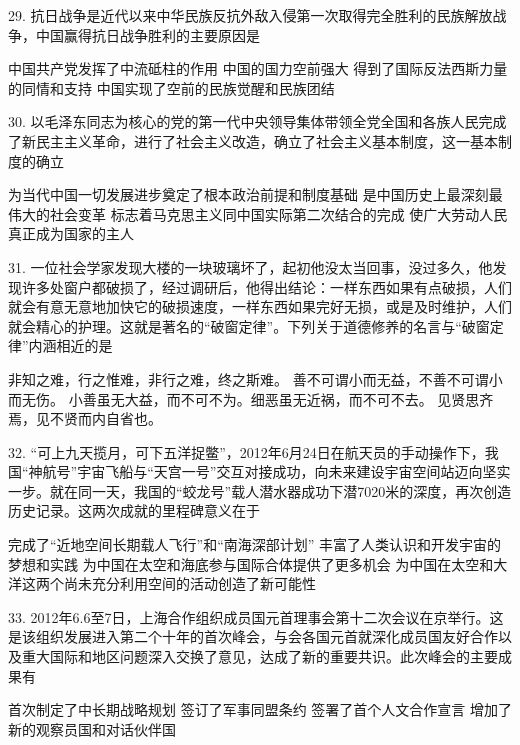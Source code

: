 29. 抗日战争是近代以来中华民族反抗外敌入侵第一次取得完全胜利的民族解放战争，中国赢得抗日战争胜利的主要原因是
\begin{choices}
	 中国共产党发挥了中流砥柱的作用
	 中国的国力空前强大
	 得到了国际反法西斯力量的同情和支持
	 中国实现了空前的民族觉醒和民族团结
\end{choices}
30. 以毛泽东同志为核心的党的第一代中央领导集体带领全党全国和各族人民完成了新民主主义革命，进行了社会主义改造，确立了社会主义基本制度，这一基本制度的确立
\begin{choices}
	 为当代中国一切发展进步奠定了根本政治前提和制度基础
	 是中国历史上最深刻最伟大的社会变革
	 标志着马克思主义同中国实际第二次结合的完成
	 使广大劳动人民真正成为国家的主人
\end{choices}
31. 一位社会学家发现大楼的一块玻璃坏了，起初他没太当回事，没过多久，他发现许多处窗户都破损了，经过调研后，他得出结论：一样东西如果有点破损，人们就会有意无意地加快它的破损速度，一样东西如果完好无损，或是及时维护，人们就会精心的护理。这就是著名的“破窗定律”。下列关于道德修养的名言与“破窗定律”内涵相近的是
\begin{choices}
	 非知之难，行之惟难，非行之难，终之斯难。
	 善不可谓小而无益，不善不可谓小而无伤。
	 小善虽无大益，而不可不为。细恶虽无近祸，而不可不去。
	 见贤思齐焉，见不贤而内自省也。
\end{choices}
32. “可上九天揽月，可下五洋捉鳖”，2012年6月24日在航天员的手动操作下，我国“神航号”宇宙飞船与“天宫一号”交互对接成功，向未来建设宇宙空间站迈向坚实一步。就在同一天，我国的“蛟龙号”载人潜水器成功下潜7020米的深度，再次创造历史记录。这两次成就的里程碑意义在于
\begin{choices}
	 完成了“近地空间长期载人飞行”和“南海深部计划”
	 丰富了人类认识和开发宇宙的梦想和实践
	 为中国在太空和海底参与国际合体提供了更多机会
	 为中国在太空和大洋这两个尚未充分利用空间的活动创造了新可能性
\end{choices}
33. 2012年6.6至7日，上海合作组织成员国元首理事会第十二次会议在京举行。这是该组织发展进入第二个十年的首次峰会，与会各国元首就深化成员国友好合作以及重大国际和地区问题深入交换了意见，达成了新的重要共识。此次峰会的主要成果有
\begin{choices}
	 首次制定了中长期战略规划
	 签订了军事同盟条约
	 签署了首个人文合作宣言
	 增加了新的观察员国和对话伙伴国
\end{choices}
\vspace{6pt}
